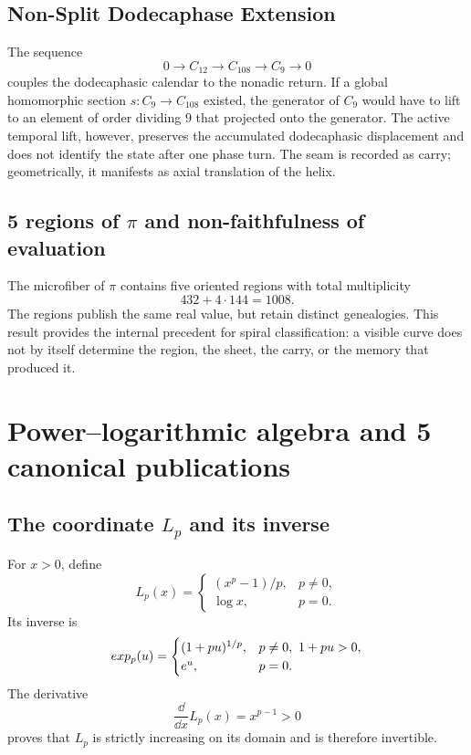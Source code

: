 \section{Non-Split Dodecaphase Extension}

The sequence
\[
 0\longrightarrow C_{12}\longrightarrow C_{108}
 \longrightarrow C_9\longrightarrow0
\]
couples the dodecaphasic calendar to the nonadic return. If a
global homomorphic section \(s:C_9\to C_{108}\) existed, the generator of \(C_9\)
would have to lift to an element of order dividing \(9\) that projected onto the
generator. The active temporal lift, however, preserves the accumulated
dodecaphasic displacement and does not identify the state after one phase turn.
The seam is recorded as carry; geometrically, it manifests as
axial translation of the helix.

\section{5 regions of \texorpdfstring{\(\pi\)}{pi} and non-faithfulness of evaluation}

The microfiber of \(\pi\) contains five oriented regions with
total multiplicity
\[
 432+4\cdot144=1008.
\]
The regions publish the same real value, but retain distinct genealogies.
This result provides the internal precedent for spiral classification: a
visible curve does not by itself determine the region, the sheet, the carry,
or the memory that produced it.

\chapter{Power--logarithmic algebra and 5 canonical publications}

\section[Power--logarithmic and inverse coordinate]{The coordinate \(L_p\) and its inverse}

For \(x>0\), define
\[
 L_p(x)=
 \begin{cases}
 (x^p-1)/p,&p\neq0,\\
 \log x,&p=0.
 \end{cases}
\]
Its inverse is
\[
 exp_p(u)=
 \begin{cases}
 (1+pu)^{1/p},&p\neq0,\ 1+pu>0,\\
 e^u,&p=0.
 \end{cases}
\]
The derivative
\[
 \frac{\dd}{\dd x}L_p(x)=x^{p-1}>0
\]
proves that \(L_p\) is strictly increasing on its domain and is therefore
invertible.


